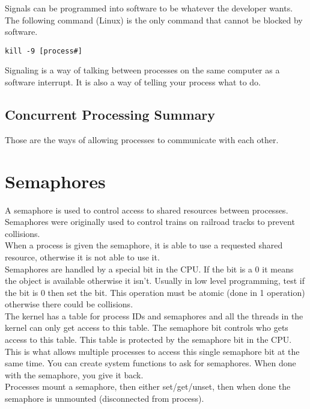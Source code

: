 \documentclass{report}
\begin{document}
\noindent
Signals can be programmed into software to be whatever the developer wants. The following command (Linux) is the only command that cannot be blocked by software.
\begin{verbatim}
kill -9 [process#]
\end{verbatim}

\noindent
Signaling is a way of talking between processes on the same computer as a software interrupt. It is also a way of telling your process what to do.

\subsection*{Concurrent Processing Summary}
Those are the ways of allowing processes to communicate with each other.

\section*{Semaphores}
A semaphore is used to control access to shared resources between processes.\\

Semaphores were originally used to control trains on railroad tracks to prevent collisions.\\

When a process is given the semaphore, it is able to use a requested shared resource, otherwise it is not able to use it.\\

Semaphores are handled by a special bit in the CPU. If the bit is a 0 it means the object is available otherwise it isn't. Usually in low level programming, test if the bit is 0 then set the bit. This operation must be atomic (done in 1 operation) otherwise there could be collisions.\\

The kernel has a table for process IDs and semaphores and all the threads in the kernel can only get access to this table. The semaphore bit controls who gets access to this table. This table is protected by the semaphore bit in the CPU. This is what allows multiple processes to access this single semaphore bit at the same time. You can create system functions to ask for semaphores. When done with the semaphore, you give it back.\\

Processes mount a semaphore, then either set/get/unset, then when done the semaphore is unmounted (disconnected from process).\\
\end{document}
